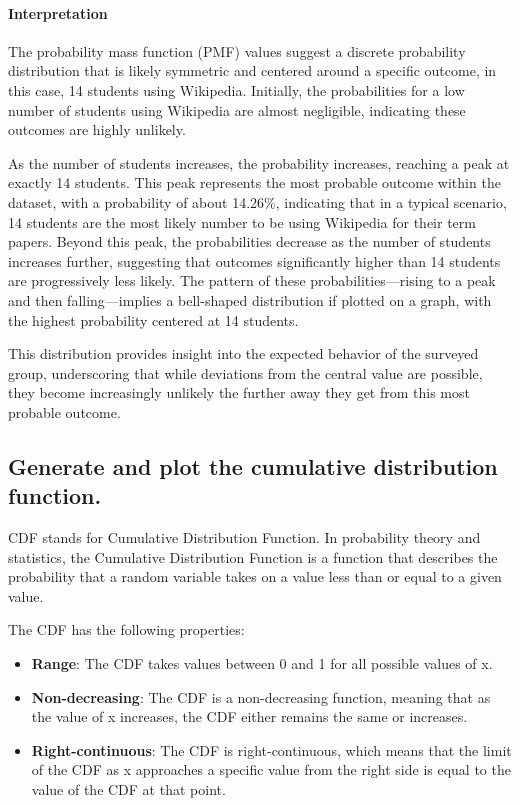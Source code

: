 \documentclass[
]{article}
\begin{document}
\paragraph{Interpretation}\label{interpretation-1}

The probability mass function (PMF) values suggest a discrete
probability distribution that is likely symmetric and centered around a
specific outcome, in this case, 14 students using Wikipedia. Initially,
the probabilities for a low number of students using Wikipedia are
almost negligible, indicating these outcomes are highly unlikely.

As the number of students increases, the probability increases, reaching
a peak at exactly 14 students. This peak represents the most probable
outcome within the dataset, with a probability of about 14.26\%,
indicating that in a typical scenario, 14 students are the most likely
number to be using Wikipedia for their term papers. Beyond this peak,
the probabilities decrease as the number of students increases further,
suggesting that outcomes significantly higher than 14 students are
progressively less likely. The pattern of these probabilities---rising
to a peak and then falling---implies a bell-shaped distribution if
plotted on a graph, with the highest probability centered at 14
students.

This distribution provides insight into the expected behavior of the
surveyed group, underscoring that while deviations from the central
value are possible, they become increasingly unlikely the further away
they get from this most probable outcome.

\subsection{Generate and plot the cumulative distribution
function.}\label{generate-and-plot-the-cumulative-distribution-function.}

CDF stands for Cumulative Distribution Function. In probability theory
and statistics, the Cumulative Distribution Function is a function that
describes the probability that a random variable takes on a value less
than or equal to a given value.

The CDF has the following properties:

\begin{itemize}
\item
  \textbf{Range}: The CDF takes values between 0 and 1 for all possible
  values of x.
\item
  \textbf{Non-decreasing}: The CDF is a non-decreasing function, meaning
  that as the value of x increases, the CDF either remains the same or
  increases.
\item
  \textbf{Right-continuous}: The CDF is right-continuous, which means
  that the limit of the CDF as x approaches a specific value from the
  right side is equal to the value of the CDF at that point.
\end{itemize}
\end{document}
